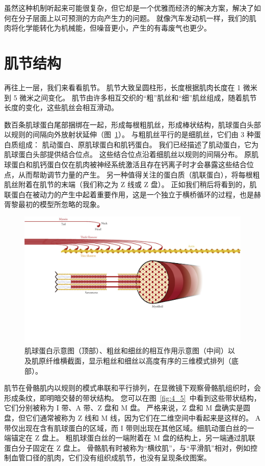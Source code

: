 虽然这种机制听起来可能很复杂，但它却是一个优雅而经济的解决方案，解决了如何在分子层面上以可预测的方向产生力的问题。
就像汽车发动机一样，我们的肌肉将化学能转化为机械能，但噪音更小，产生的有毒废气也更少。



\section{肌节结构}

再往上一层，我们来看看肌节。
肌节大致呈圆柱形，长度根据肌肉长度在 1 微米到 5 微米之间变化。
肌节由许多相互交织的“粗”肌丝和“细”肌丝组成，随着肌节长度的变化，这些肌丝会相互滑动。


数百条肌球蛋白尾部捆绑在一起，形成每根粗肌丝，形成棒状结构，肌球蛋白头部以规则的间隔向外放射状延伸（图~\ref{fig:4_4}）。
与粗肌丝平行的是细肌丝，它们由 3 种蛋白质组成：
肌动蛋白、原肌球蛋白和肌钙蛋白。
我们已经描述了肌动蛋白，它为肌球蛋白头部提供结合位点。
这些结合位点沿着细肌丝以规则的间隔分布。
原肌球蛋白和肌钙蛋白仅在肌肉被神经系统激活且存在钙离子时才会暴露这些结合位点，从而帮助调节力量的产生。
另一种值得关注的蛋白质（肌联蛋白），将每根粗肌丝附着在肌节的末端（我们称之为 Z 线或 Z 盘）。
正如我们稍后将看到的，肌联蛋白在被动力的产生中起着重要作用，这是一个独立于横桥循环的过程，也是赫胥黎最初的模型所忽略的现象。

\begin{figure}[!htb]
	\centering
	\includegraphics[width=1.0\linewidth]{chap4/4_4}
	\caption{肌球蛋白示意图（顶部）、粗丝和细丝的相互作用示意图（中间）以及肌原纤维横截面，显示粗丝和细丝以高度有序的三维模式排列（底部）。 \label{fig:4_4}}
\end{figure}

肌节在骨骼肌内以规则的模式串联和平行排列，在显微镜下观察骨骼肌组织时，会形成条纹，即明暗交替的带状结构。
您可以在图~\ref{fig:4_5}~中看到这些带状结构，它们分别被称为 I 带、A 带、Z 盘和 M 盘。
严格来说，Z 盘和 M 盘确实是圆盘，但它们通常被称为 Z 线和 M 线，因为它们在二维空间中看起来是这样的。
A 带仅出现在含有肌球蛋白的区域，而 I 带则出现在其他区域。细肌动蛋白丝的一端锚定在 Z 盘上。
粗肌球蛋白丝的一端附着在 M 盘的结构上，另一端通过肌联蛋白分子固定在 Z 盘上。
骨骼肌有时被称为“横纹肌”，与“平滑肌”相对，例如控制血管口径的肌肉，它们没有组织成肌节，也没有呈现条纹图案。

